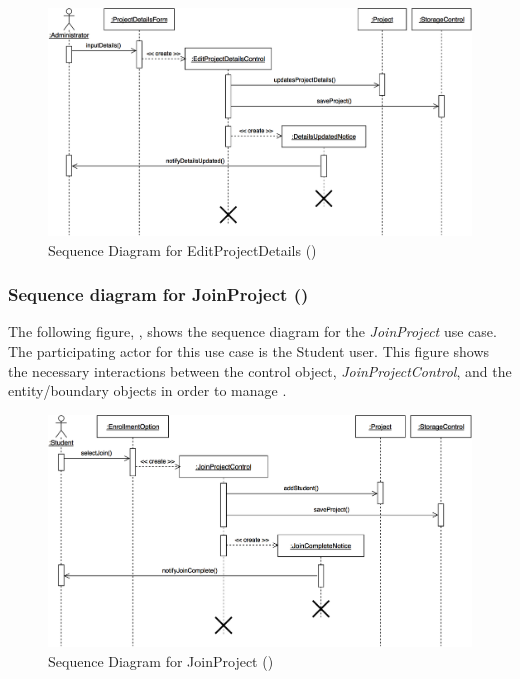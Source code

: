 \documentclass[12pt,letterpaper]{article}
\begin{document}
\begin{figure}[H]
	\centering{}
	\includegraphics[scale=0.25]{imgs/seq/edit-project-details.png}
	\caption[ - Sequence Diagram for EditProjectDetails]{Sequence Diagram for EditProjectDetails ()}
\end{figure}

\subsubsection*{Sequence diagram for JoinProject ()}

The following figure, , shows the sequence diagram for the {\it JoinProject} use case. The participating actor for this use case is
the Student user. This figure shows the necessary interactions between the control object, {\it JoinProjectControl}, and the
entity/boundary objects in order to manage .

\begin{figure}[H]
	\centering{}
	\includegraphics[scale=0.25]{imgs/seq/join-project.png}
	\caption[ - Sequence Diagram for JoinProject]{Sequence Diagram for JoinProject ()}
\end{figure}
\end{document}

